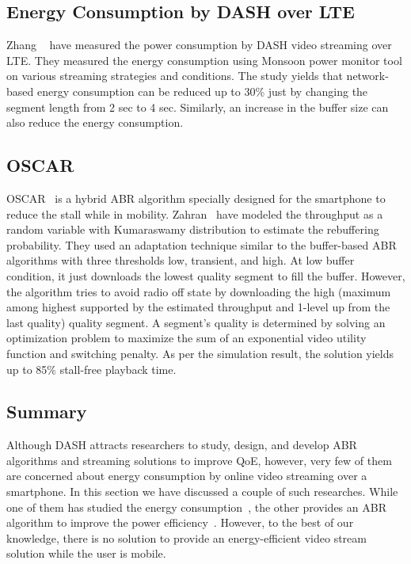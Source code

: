 \subsection{Energy Consumption by DASH over LTE}
Zhang \etal\ \cite{10.1145/2910018.2910656} have measured the power consumption by \ac{DASH} video streaming over \ac{LTE}. They measured the energy consumption using Monsoon power monitor \cite{monsoonmonitor} tool on various streaming strategies and conditions. The study yields that network-based energy consumption can be reduced up to 30\% just by changing the segment length from 2 sec to 4 sec. Similarly, an increase in the buffer size can also reduce the energy consumption.

\subsection{OSCAR}
OSCAR~\cite{10.1145/2910018.2910655} is a hybrid \ac{ABR} algorithm specially designed for the smartphone to reduce the stall while in mobility. Zahran \etal\ have modeled the throughput as a random variable with Kumaraswamy distribution \cite{jones2009kumaraswamy} to estimate the rebuffering probability. They used an adaptation technique similar to the buffer-based \ac{ABR} algorithms with three thresholds low, transient, and high. At low buffer condition, it just downloads the lowest quality segment to fill the buffer. However, the algorithm tries to avoid radio off state by downloading the high (maximum among highest supported by the estimated throughput and 1-level up from the last quality) quality segment. A segment's quality is determined by solving an optimization problem to maximize the sum of an exponential video utility function and switching penalty. As per the simulation result, the solution yields up to 85\% stall-free playback time.

\subsection{Summary}
Although \ac{DASH} attracts researchers to study, design, and develop \ac{ABR} algorithms and streaming solutions to improve \ac{QoE}, however, very few of them are concerned about energy consumption by online video streaming over a smartphone. In this section we have discussed a couple of such researches. While one of them has studied the energy consumption~\cite{10.1145/2910018.2910656}, the other provides an \ac{ABR} algorithm to improve the power efficiency~\cite{10.1145/2910018.2910655}. However, to the best of our knowledge, there is no solution to provide an energy-efficient video stream solution while the user is mobile.